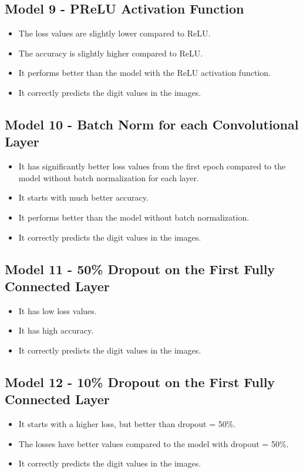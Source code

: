 \documentclass{article}
\begin{document}
\subsection*{Model 9 - PReLU Activation Function}
\begin{itemize}
  \item The loss values are slightly lower compared to ReLU.
  \item The accuracy is slightly higher compared to ReLU.
  \item It performs better than the model with the ReLU activation function.
  \item It correctly predicts the digit values in the images.
\end{itemize}

\subsection*{Model 10 - Batch Norm for each Convolutional Layer}
\begin{itemize}
  \item It has significantly better loss values from the first epoch compared to the model without batch normalization for each layer.
  \item It starts with much better accuracy.
  \item It performs better than the model without batch normalization.
  \item It correctly predicts the digit values in the images.
\end{itemize}

\subsection*{Model 11 - 50\% Dropout on the First Fully Connected Layer}
\begin{itemize}
  \item It has low loss values.
  \item It has high accuracy.
  \item It correctly predicts the digit values in the images.
\end{itemize}

\subsection*{Model 12 - 10\% Dropout on the First Fully Connected Layer}
\begin{itemize}
  \item It starts with a higher loss, but better than dropout = 50\%.
  \item The losses have better values compared to the model with dropout = 50\%.
  \item It correctly predicts the digit values in the images.
\end{itemize}
\end{document}
